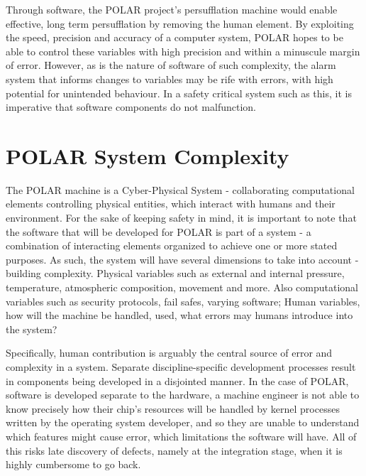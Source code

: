 Through software, the POLAR project's persufflation machine would enable effective, long term persufflation by removing the human element. By exploiting the speed, precision and accuracy of a computer system, POLAR hopes to be able to control these variables with high precision and within a minuscule margin of error. However, as is the nature of software of such complexity, the alarm system that informs changes to variables may be rife with errors, with high potential for unintended behaviour\parencite{JamiaOCW154}. In a safety critical system such as this, it is imperative that software components do not malfunction.


\section{POLAR System Complexity}
The POLAR machine is a Cyber-Physical System - collaborating computational elements controlling physical entities, which interact with humans and their environment. For the sake of keeping safety in mind, it is important to note that the software that will be developed for POLAR is part of a system - a combination of interacting elements organized to achieve one or more stated purposes\parencite{walden_roedler_forsberg_hamelin_shortell_2007}. As such, the system will have several dimensions to take into account - building complexity. Physical variables such as external and internal pressure, temperature, atmospheric composition, movement and more. Also computational variables such as security protocols, fail safes, varying software; Human variables, how will the machine be handled, used, what errors may humans introduce into the system? 

Specifically, human contribution is arguably the central source of error and complexity in a system. Separate discipline-specific development processes result in components being developed in a disjointed manner. In the case of POLAR, software is developed separate to the hardware, a machine engineer is not able to know precisely how their chip's resources will be handled by kernel processes written by the operating system developer, and so they are unable to understand which features might cause error, which limitations the software will have. All of this risks late discovery of defects, namely at the integration stage, when it is highly cumbersome to go back. 

